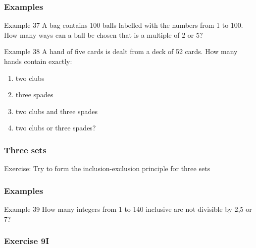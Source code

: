 \documentclass[
	11pt, %
]{beamer}
\begin{document}
\begin{frame}[t]
    \frametitle{Examples}
    \begin{block}{Example 37}
        A bag contains 100 balls labelled with the numbers from 1 to 100. How many ways can a ball be chosen that is a multiple of 2 or 5?
    \end{block}
\end{frame}
\begin{block}{Example 38}
    A hand of five cards is dealt from a deck of 52 cards. How many hands contain exactly:\\
    \begin{enumerate}
        \item two clubs
        \item three spades
        \item two clubs and three spades
        \item two clubs or three spades?
    \end{enumerate}
\end{block}

\begin{frame}[t]
    \frametitle{Three sets}
    Exercise: Try to form the inclusion-exclusion principle for three sets
\end{frame}

\begin{frame}[t]
    \frametitle{Examples}
    \begin{block}{Example 39}
        How many integers from 1 to 140 inclusive are not divisible by 2,5 or 7?
    \end{block}
\end{frame}

\begin{frame}
    \frametitle{Exercise 9I}
\end{frame}
\end{document}
